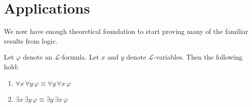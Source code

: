 \newpage
\section{Applications}

\noindent
We now have enough theoretical foundation to start proving many of the familiar results from logic.
\begin{thm}
     \label{logical-equivalence:the-order-of-quantifiers-of-the-same-type-does-not-matter}
    Let \( \varphi \) denote an \( \mathcal{L} \)-formula. Let \( x \) and \( y \) denote \( \mathcal{L} \)-variables.
    Then the following hold:
    \begin{enumerate}[topsep=2pt,label=\textup{\texttt{(\alph*)}}]
        \item \( \forall x \, \forall y \, \varphi \equiv \forall y \, \forall x \, \varphi \)  \label{enum:swapping-universal-quantifiers}
        \item \( \exists x \, \exists y \, \varphi \equiv \exists y \, \exists x \, \varphi \)  \label{enum:swapping-existential-quantifiers}
    \end{enumerate}
\end{thm}


